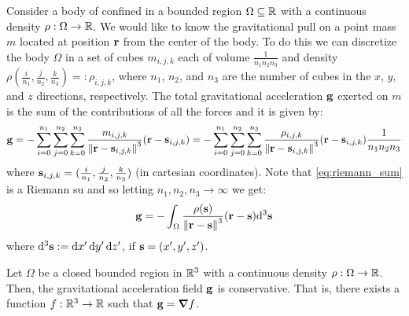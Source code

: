 \documentclass[../main.tex]{subfiles}
\begin{document}
Consider a body of confined in a bounded region $\Omega\subseteq\mathbb{R}$ with a continuous density $\rho:\Omega\to\mathbb{R}$. We would like to know the gravitational pull on a point mass $m$ located at position $\boldsymbol{\mathrm{r}}$ from the center of the body. To do this we can discretize the body $\Omega$ in a set of cubes $m_{i,j,k}$ each of volume $\frac{1}{n_1n_2n_3}$ and density $\rho(\frac{i}{n_1},\frac{j}{n_2},\frac{k}{n_3})=:\rho_{i,j,k}$, where $n_1$, $n_2$, and $n_3$ are the number of cubes in the $x$, $y$, and $z$ directions, respectively. The total gravitational acceleration $\boldsymbol{\mathrm{g}}$ exerted on $m$ is the sum of the contributions of all the forces and it is given by:
\begin{equation}\label{eq:riemann_sum}
  \boldsymbol{\mathrm{g}}=-\sum_{i=0}^{n_1}\sum_{j=0}^{n_2}\sum_{k=0}^{n_3}\frac{m_{i,j,k}}{\left\|\boldsymbol{\mathrm{r}}-\boldsymbol{\mathrm{s}}_{i,j,k}\right\|^3}(\boldsymbol{\mathrm{r}}-\boldsymbol{\mathrm{s}}_{i,j,k})=-\sum_{i=0}^{n_1}\sum_{j=0}^{n_2}\sum_{k=0}^{n_3}\frac{\rho_{i,j,k}}{\left\|\boldsymbol{\mathrm{r}}-\boldsymbol{\mathrm{s}}_{i,j,k}\right\|^3}(\boldsymbol{\mathrm{r}}-\boldsymbol{\mathrm{s}}_{i,j,k})\frac{1}{n_1n_2n_3}
\end{equation}
where $\boldsymbol{\mathrm{s}}_{i,j,k}=(\frac{i}{n_1},\frac{j}{n_2},\frac{k}{n_3})$ (in cartesian coordinates). Note that \cref{eq:riemann_sum} is a Riemann su and so letting $n_1,n_2,n_3\to\infty$ we get:
\begin{equation}\label{eq:limit}
  \boldsymbol{\mathrm{g}}=-\int_{\Omega}\frac{\rho(\boldsymbol{\mathrm{s}})}{\left\|\boldsymbol{\mathrm{r}}-\boldsymbol{\mathrm{s}}\right\|^3}(\boldsymbol{\mathrm{r}}-\boldsymbol{\mathrm{s}})\dd^3{\boldsymbol{\mathrm{s}}}
\end{equation}
where $\dd^3{\boldsymbol{\mathrm{s}}}:=\dd{x'}\dd{y'}\dd{z'}$, if $\boldsymbol{\mathrm{s}}=(x',y',z')$.
\begin{theorem}
  Let $\Omega$ be a closed bounded region in $\mathbb{R}^3$ with a continuous density $\rho:\Omega\to\mathbb{R}$. Then, the gravitational acceleration field $\boldsymbol{\mathrm{g}}$ is conservative. That is, there exists a function $f:\mathbb{R}^3\rightarrow\mathbb{R}$ such that $\boldsymbol{\mathrm{g}}=\grad f$.
\end{theorem}
\end{document}
